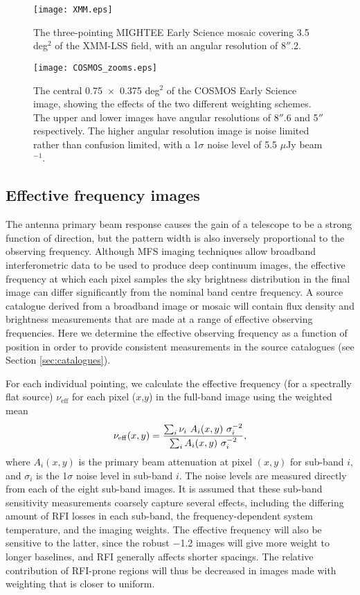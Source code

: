 \documentclass[usenatbib,usedcolumn]{mnras}
\begin{document}
\begin{figure*}
\centering
\texttt{[image: XMM.eps]}
\caption{The three-pointing MIGHTEE Early Science mosaic covering 3.5 deg$^{2}$ of the XMM-LSS field, with an angular resolution of 8$''$.2.}
\label{fig:xmmlss}
\end{figure*}


\begin{figure*}
\centering
\texttt{[image: COSMOS\_zooms.eps]}
\caption{The central 0.75~$\times$~0.375 deg$^{2}$ of the COSMOS Early Science image, showing the effects of the two different weighting schemes. The upper and lower images have angular resolutions of 8$''$.6 and 5$''$ respectively. The higher angular resolution image is noise limited rather than confusion limited, with a 1$\sigma$ noise level of 5.5 $\mu$Jy beam$^{-1}$.}
\label{fig:zooms}
\end{figure*}



\subsection{Effective frequency images}
\label{sec:effectivefreq}

The antenna primary beam response causes the gain of a telescope to be a strong function of direction, but the pattern width is also inversely proportional to the observing frequency. Although MFS imaging techniques allow broadband interferometric data to be used to produce deep continuum images, the effective frequency at which each pixel samples the sky brightness distribution in the final image can differ significantly from the nominal band centre frequency. A source catalogue derived from a broadband image or mosaic will contain flux density and brightness measurements that are made at a range of effective observing frequencies. Here we determine the effective observing frequency as a function of position in order to provide consistent measurements in the source catalogues (see Section \ref{sec:catalogues}).

For each individual pointing, we calculate the effective frequency (for a spectrally flat source) $\nu_{\mathrm{eff}}$ for each pixel ($x$,$y$) in the full-band image using the weighted mean
\begin{equation}
\nu_{\rm eff} (x,y) = \frac{\sum_{i} \nu_i~A_{i}(x,y)~\sigma_{i}^{-2}}{\sum_i A_{i}(x,y)~\sigma_{i}^{-2}},
\end{equation}
where $A_{i}(x,y)$ is the primary beam attenuation at pixel $(x,y)$ for sub-band $i$, and $\sigma_{i}$ is the 1$\sigma$ noise level in sub-band $i$. The noise levels are measured directly from each of the eight sub-band images. It is assumed that these sub-band sensitivity measurements coarsely capture several effects, including the differing amount of RFI losses in each sub-band, the frequency-dependent system temperature, and the imaging weights. The effective frequency will also be sensitive to the latter, since the robust $-$1.2 images will give more weight to longer baselines, and RFI generally affects shorter spacings. The relative contribution of RFI-prone regions will thus be decreased in images made with weighting that is closer to uniform.
\end{document}

